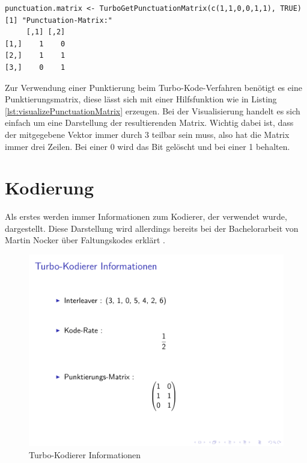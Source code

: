 \begin{lstlisting}[caption=Visualisierung der Punktierungssmatrix, label={lst:visualizePunctuationMatrix}, float=!ht]
punctuation.matrix <- TurboGetPunctuationMatrix(c(1,1,0,0,1,1), TRUE)
[1] "Punctuation-Matrix:"
     [,1] [,2]
[1,]    1    0
[2,]    1    1
[3,]    0    1
\end{lstlisting}

Zur Verwendung einer Punktierung beim Turbo-Kode-Verfahren benötigt es eine Punktierungsmatrix, diese lässt sich mit einer Hilfsfunktion wie in Listing \ref{lst:visualizePunctuationMatrix} erzeugen. Bei der Visualisierung handelt es sich einfach um eine Darstellung der resultierenden Matrix. Wichtig dabei ist, dass der mitgegebene Vektor immer durch 3 teilbar sein muss, also hat die Matrix immer drei Zeilen. Bei einer 0 wird das Bit gelöscht und bei einer 1 behalten.

\section{Kodierung}
\label{sec:visualization_encode}
Als erstes werden immer Informationen zum Kodierer, der verwendet wurde, dargestellt. Diese Darstellung wird allerdings bereits bei der Bachelorarbeit von Martin Nocker über Faltungskodes erklärt \cite{nocker}.

\begin{figure}[!ht]
\centering
\includegraphics[width=\ScaleIfNeeded]{pictures/TurboEncodePunctured1}
\caption{Turbo-Kodierer Informationen}
\label{pic:TurboCoderInformation}
\end{figure}  

